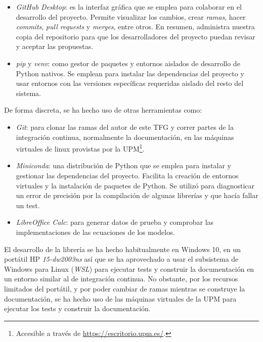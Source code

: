 \begin{itemize}
\begin{itemize}
          \end{itemize}

    \item \textit{GitHub Desktop}: es la interfaz gráfica que se emplea para colaborar en el desarrollo del proyecto. Permite visualizar los cambios, crear \textit{ramas}, hacer \textit{commits}, \textit{pull requests} y \textit{merges}, entre otros. En resumen, administra nuestra copia del repositorio para que los desarrolladores del proyecto puedan revisar y aceptar las propuestas.
    \item \textit{pip} y \textit{venv}: como gestor de paquetes y entornos aislados de desarrollo de Python nativos. Se emplean para instalar las dependencias del proyecto y usar entornos con las versiones específicas requeridas aislado del resto del sistema.


\end{itemize}

De forma discreta, se ha hecho uso de otras herramientas como:

\begin{itemize}
    \item \textit{Git}: para clonar las ramas del autor de este TFG y correr partes de la integración continua, normalmente la documentación, en las máquinas virtuales de linux provistas por la UPM\footnote{Accesible a través de \url{https://escritorio.upm.es/}.}.
    \item \textit{Miniconda}: una distribución de Python que se emplea para instalar y gestionar las dependencias del proyecto. Facilita la creación de entornos virtuales y la instalación de paquetes de Python. Se utilizó para diagnosticar un error de precisión por la compilación de algunas librerías y que hacía fallar un test.
    \item \textit{LibreOffice Calc}: para generar datos de prueba y comprobar las implementaciones de las ecuaciones de los modelos.
\end{itemize}

El desarrollo de la librería se ha hecho habitualmente en Windows 10, en un portátil HP \textit{15-dw2003ns} así que se ha aprovechado a usar el subsistema de Windows para Linux (\textit{WSL}) para ejecutar tests y construir la documentación en un entorno similar al de integración continua. No obstante, por los recursos limitados del portátil, y por poder cambiar de ramas mientras se construye la documentación, se ha hecho uso de las máquinas virtuales de la UPM para ejecutar los tests y construir la documentación.

